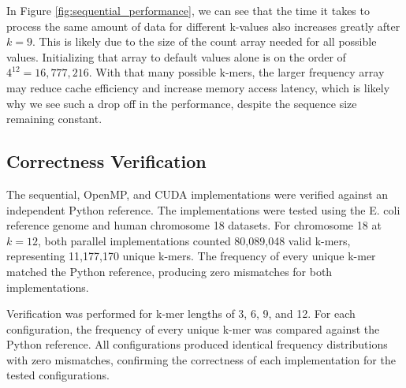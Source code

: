 \documentclass{article}
\begin{document}
\vspace{\baselineskip}

\FloatBarrier

\FloatBarrier

\vspace{\baselineskip}

In Figure \ref{fig:sequential_performance}, we can see that the time it takes to process the same amount of data for different k-values also increases greatly 
after $k=9$. This is likely due to the size of the count array needed for all possible values. Initializing that array to default values alone is on the 
order of $4^{12}= 16{,}777{,}216$. With that many possible k-mers, the larger frequency array may reduce cache efficiency and increase memory access latency, 
which is likely why we see such a drop off in the performance, despite the sequence size remaining constant.

\vspace{\baselineskip}

\FloatBarrier

\FloatBarrier

\vspace{\baselineskip}

\subsection{Correctness Verification}

\vspace{\baselineskip}

The sequential, OpenMP, and CUDA implementations were verified against an independent Python reference.
The implementations were tested using the E. coli reference genome and human chromosome 18 datasets.
For chromosome 18 at \(k=12\), both parallel implementations counted 80,089,048 valid k-mers, representing 
11,177,170 unique k-mers. The frequency of every unique k-mer matched the Python reference, producing zero 
mismatches for both implementations.

\vspace{\baselineskip}

Verification was performed for k-mer lengths of 3, 6, 9, and 12. For each configuration,
the frequency of every unique k-mer was compared against the Python reference. All 
configurations produced identical frequency distributions with zero mismatches, confirming
the correctness of each implementation for the tested configurations.
\end{document}

